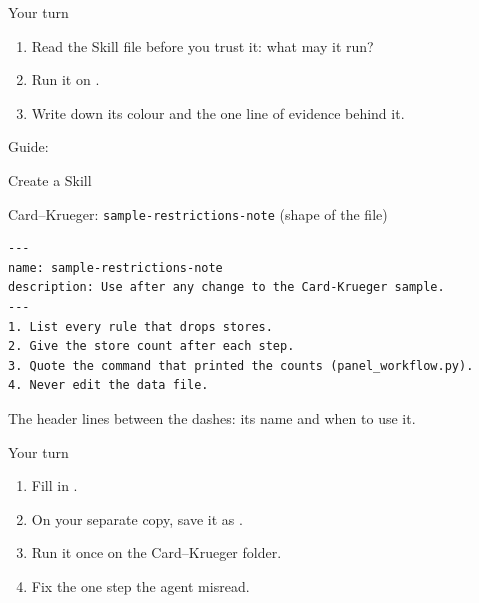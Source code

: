 \begin{frame}{Your turn}
  \vspace{0.3em}
  \begin{enumerate}
    \item Read the Skill file before you trust it: what may it run?
    \item Run it on .
    \item Write down its colour and the one line of evidence behind it.
  \end{enumerate}
  \vspace{0.5em}
  {\small Guide:  \textperiodcentered\ }
\end{frame}

\begin{frame}{Create a Skill}
\end{frame}

\begin{frame}[fragile]{Card--Krueger: \texttt{sample-restrictions-note}}
  {\small {} (shape of the file)}
  \begin{lstlisting}[style=markdown,basicstyle=\ttfamily\footnotesize]
---
name: sample-restrictions-note
description: Use after any change to the Card-Krueger sample.
---
1. List every rule that drops stores.
2. Give the store count after each step.
3. Quote the command that printed the counts (panel_workflow.py).
4. Never edit the data file.
  \end{lstlisting}
  {\small The header lines between the dashes: its name and when to use it.}
\end{frame}

\begin{frame}{Your turn}
  \vspace{0.3em}
  \begin{enumerate}
    \item Fill in .
    \item On your separate copy, save it as .
    \item Run it once on the Card--Krueger folder.
    \item Fix the one step the agent misread.
  \end{enumerate}
\end{frame}

